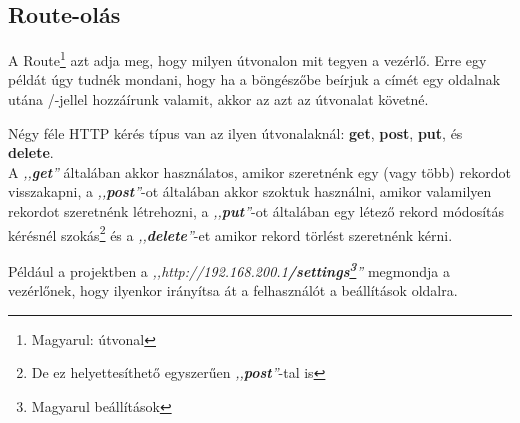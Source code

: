 \documentclass[
]{thesis-ekf}
\theoremstyle{definition}
\theoremstyle{remark}
\begin{document}
	\subsection{Route-olás}
	A Route\footnote{Magyarul: útvonal} azt adja meg, hogy milyen útvonalon mit tegyen a vezérlő. Erre egy példát úgy tudnék mondani, hogy ha a böngészőbe beírjuk a címét egy oldalnak utána /-jellel hozzáírunk valamit, akkor az azt az útvonalat követné.
	
	Négy féle HTTP kérés típus van az ilyen útvonalaknál: \textbf{get}, \textbf{post}, \textbf{put}, és \textbf{delete}.\\
	A \emph{,,\textbf{get}''} általában akkor használatos, amikor szeretnénk egy (vagy több) rekordot visszakapni, a \emph{,,\textbf{post}''}-ot általában akkor szoktuk használni, amikor valamilyen rekordot szeretnénk létrehozni, a \emph{,,\textbf{put}''}-ot általában egy létező rekord módosítás kérésnél szokás\footnote{De ez helyettesíthető egyszerűen \emph{,,\textbf{post}''}-tal is} és a \emph{,,\textbf{delete}''}-et amikor rekord törlést szeretnénk kérni.
	
	Például a projektben a \emph{,,http://192.168.200.1\textbf{/settings\footnote{Magyarul beállítások}}''} megmondja a vezérlőnek, hogy ilyenkor irányítsa át a felhasználót a beállítások oldalra.
	
\end{document}
